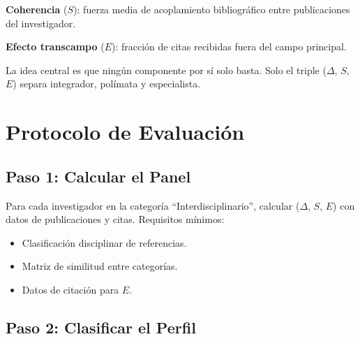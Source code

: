 \documentclass[
]{article}
\providecommand{\tightlist}{%
  \setlength{\itemsep}{0pt}\setlength{\parskip}{0pt}}
\begin{document}
\textbf{Coherencia} (\(S\)): fuerza media de acoplamiento bibliográfico
entre publicaciones del investigador.

\textbf{Efecto transcampo} (\(E\)): fracción de citas recibidas fuera
del campo principal.

La idea central es que ningún componente por sí solo basta. Solo el
triple (\(\Delta\), \(S\), \(E\)) separa integrador, polímata y
especialista.

\hypertarget{protocolo-de-evaluaciuxf3n}{%
\section{Protocolo de Evaluación}\label{protocolo-de-evaluaciuxf3n}}

\hypertarget{paso-1-calcular-el-panel}{%
\subsection{Paso 1: Calcular el Panel}\label{paso-1-calcular-el-panel}}

Para cada investigador en la categoría ``Interdisciplinario'', calcular
(\(\Delta\), \(S\), \(E\)) con datos de publicaciones y citas.
Requisitos mínimos:

\begin{itemize}
\tightlist
\item
  Clasificación disciplinar de referencias.
\item
  Matriz de similitud entre categorías.
\item
  Datos de citación para \(E\).
\end{itemize}

\hypertarget{paso-2-clasificar-el-perfil}{%
\subsection{Paso 2: Clasificar el
Perfil}\label{paso-2-clasificar-el-perfil}}
\end{document}
